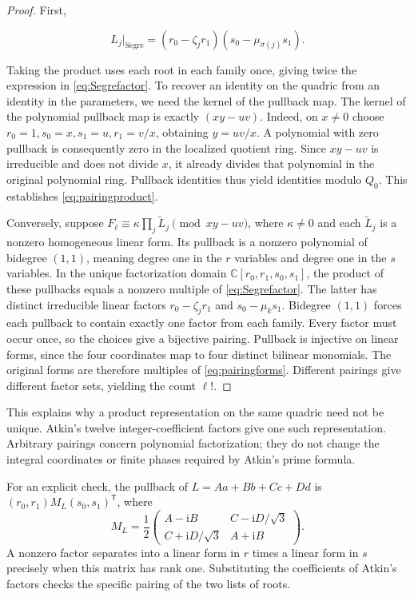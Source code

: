 \documentclass[a4paper,11pt]{article}
\theoremstyle{definition}
\newcommand{\C}{\mathbb C}
\newcommand{\iu}{\mathrm i}
\begin{document}
\begin{proof}
First,

\[
 L_j\big|_{\mathrm{Segre}}
 =(r_0-\zeta_jr_1)(s_0-\mu_{\sigma(j)}s_1).
\]

Taking the product uses each root in each family once, giving
twice the expression in \eqref{eq:Segrefactor}.
To recover an identity on the quadric from an identity in the parameters,
we need the kernel of the pullback map.
The kernel of the polynomial pullback map is exactly \((xy-uv)\).
Indeed, on \(x\ne0\) choose
\(r_0=1,s_0=x,s_1=u,r_1=v/x\), obtaining \(y=uv/x\).
A polynomial with zero pullback is consequently zero in the
localized quotient ring. Since \(xy-uv\) is irreducible and does
not divide \(x\), it already divides that polynomial in the original
polynomial ring. Pullback identities thus yield identities modulo \(Q_0\).
This establishes \eqref{eq:pairingproduct}.

Conversely, suppose
\(F_\ell\equiv\kappa\prod_j\widetilde L_j\pmod{xy-uv}\),
where \(\kappa\ne0\) and each \(\widetilde L_j\) is a nonzero
homogeneous linear form. Its pullback is a nonzero polynomial
of bidegree \((1,1)\), meaning degree one in the \(r\) variables
and degree one in the \(s\) variables. In the unique factorization domain
\(\C[r_0,r_1,s_0,s_1]\), the product of these pullbacks equals
a nonzero multiple of \eqref{eq:Segrefactor}.
The latter has distinct irreducible linear factors
\(r_0-\zeta_jr_1\) and \(s_0-\mu_ks_1\).
Bidegree \((1,1)\) forces each pullback to contain exactly one
factor from each family. Every factor must occur once,
so the choices give a bijective pairing.
Pullback is injective on linear forms, since the four coordinates
map to four distinct bilinear monomials.
The original forms are therefore multiples of
\eqref{eq:pairingforms}. Different pairings give different
factor sets, yielding the count \(\ell!\).
\end{proof}

This explains why a product representation on the same quadric
need not be unique. Atkin's twelve integer-coefficient factors
give one such representation. Arbitrary pairings concern polynomial
factorization; they do not change the integral coordinates or
finite phases required by Atkin's prime formula.

For an explicit check, the pullback of \(L=Aa+Bb+Cc+Dd\) is
\((r_0,r_1)M_L(s_0,s_1)^{\mathsf T}\), where
\begin{equation}\label{eq:factormatrix}
 M_L=\frac12
 \begin{pmatrix}
 A-\iu B&C-\iu D/\sqrt3\\
 C+\iu D/\sqrt3&A+\iu B
 \end{pmatrix}.
\end{equation}
A nonzero factor separates into a linear form in \(r\) times a
linear form in \(s\) precisely when this matrix has rank one.
Substituting the coefficients of Atkin's factors checks the
specific pairing of the two lists of roots.
\end{document}
